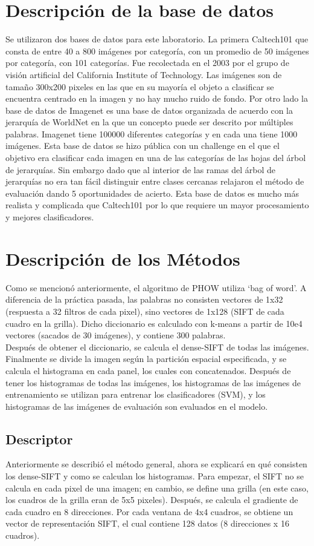 \documentclass[10pt,twocolumn,letterpaper]{article}
\begin{document}
\section{Descripción de la base de datos}
Se utilizaron dos bases de datos para este laboratorio. La primera Caltech101 \cite{fei2007learning} que consta de entre 40 a 800 imágenes por categoría, con un promedio de 50 imágenes por categoría, con 101 categorías. Fue recolectada en el 2003 por el grupo de visión artificial del California Institute of Technology.  Las imágenes son de tamaño 300x200 pixeles en las que en su mayoría el objeto a clasificar se encuentra centrado en la imagen y no hay mucho ruido de fondo.  Por otro lado la base de datos de Imagenet \cite{deng2009imagenet} es una base de datos organizada de acuerdo con la jerarquía de WorldNet en la que un concepto puede ser descrito por múltiples palabras. Imagenet tiene 100000 diferentes categorías y en cada una tiene 1000 imágenes. Esta base de datos se hizo pública con un challenge en el que el objetivo era clasificar cada imagen en una de las categorías de las hojas del árbol de jerarquías. Sin embargo dado que al interior de las ramas del árbol de jerarquías no era tan fácil distinguir entre clases cercanas relajaron el método de evaluación dando 5 oportunidades de acierto.  Esta base de datos es mucho más realista y complicada que Caltech101 por lo que requiere un mayor procesamiento y mejores clasificadores. 
\section{Descripción de los Métodos}
Como se mencionó anteriormente, el algoritmo de PHOW utiliza ‘bag of word’. A diferencia de la práctica pasada, las palabras no consisten vectores de 1x32 (respuesta a 32 filtros de cada pixel), sino vectores de 1x128 (SIFT de cada cuadro en la grilla). Dicho diccionario es calculado con k-means a partir de 10e4 vectores (sacados de 30 imágenes), y contiene 300 palabras.\\
Después de obtener el diccionario, se calcula el dense-SIFT de todas las imágenes. Finalmente se divide la imagen según la partición espacial especificada, y se calcula el histograma en cada panel, los cuales con concatenados. Después de tener los histogramas de todas las imágenes, los histogramas de las imágenes de entrenamiento se utilizan para entrenar los clasificadores (SVM), y los histogramas de las imágenes de evaluación son evaluados en el modelo.
\subsection{Descriptor}
Anteriormente se describió el método general, ahora se explicará en qué consisten los dense-SIFT y como se calculan los histogramas. Para empezar, el SIFT no se calcula en cada pixel de una imagen; en cambio, se define una grilla (en este caso, los cuadros de la grilla eran de 5x5 pixeles). Después, se calcula el gradiente de cada cuadro en 8 direcciones. Por cada ventana de 4x4 cuadros, se obtiene un vector de representación SIFT, el cual contiene 128 datos (8 direcciones x 16 cuadros). \\
\end{document}
